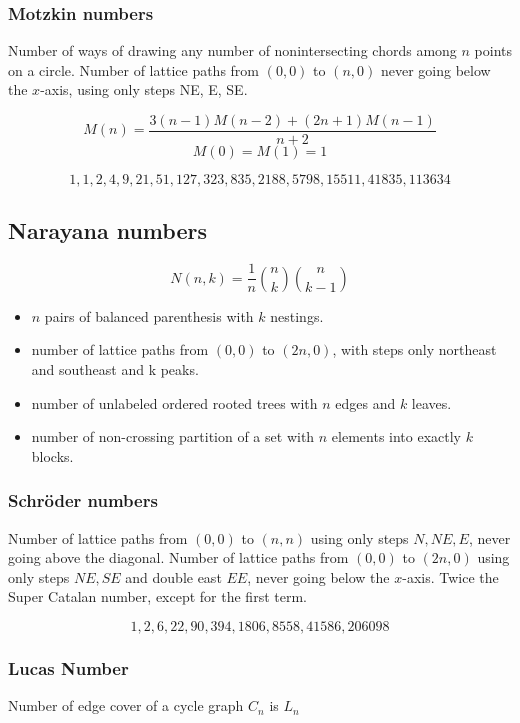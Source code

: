 {    \subsubsection{Motzkin numbers}
    Number of ways of drawing any number of nonintersecting chords among \( n \) points on a circle. Number of lattice paths from \((0, 0)\) to \((n, 0)\) never going below the \( x \)-axis, using only steps NE, E, SE.
    
    \[
    M(n) = \frac{3(n - 1)M(n - 2) + (2n + 1)M(n - 1)}{n + 2}
    \]
    \[
    M(0) = M(1) = 1
    \]
    
    \[
    1, 1, 2, 4, 9, 21, 51, 127, 323, 835, 2188, 5798, 15511, 41835, 113634
    \]

  \subsection{Narayana numbers}
  \[ N(n, k) = \frac{1}{n} \binom{n}{k} \binom{n}{k - 1} \]
  \begin{itemize}[leftmargin=*, noitemsep]
    \item $n$ pairs of balanced parenthesis with $k$ nestings.
    \item number of lattice paths from $(0, 0)$ to $(2n,0)$, with steps only northeast and southeast and k peaks.
    \item number of unlabeled ordered rooted trees with $n$ edges and $k$ leaves.
    \item number of non-crossing partition of a set with $n$ elements into exactly $k$ blocks.
  \end{itemize}

  \subsubsection{Schröder numbers}
Number of lattice paths from \((0, 0)\) to \((n, n)\) using only steps \(N, NE, E\), never going above the diagonal. Number of lattice paths from \((0, 0)\) to \((2n, 0)\) using only steps \(NE, SE\) and double east \(EE\), never going below the \(x\)-axis. Twice the Super Catalan number, except for the first term.

\[
1, 2, 6, 22, 90, 394, 1806, 8558, 41586, 206098
\]


  \subsubsection{Lucas Number}

  Number of edge cover of a cycle graph $ C_n $ is $ L_n $

}
